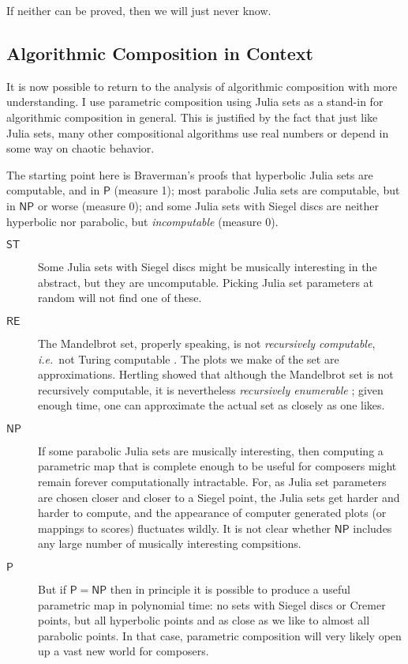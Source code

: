 \documentclass[11pt,papersize=a4]{scrartcl}
\begin{document}
If neither can be proved, then we will just never know.
 
\subsection*{Algorithmic Composition in Context}

It is now possible to return to the analysis of algorithmic composition with more understanding. I use parametric composition using Julia sets as a stand-in for algorithmic composition in general. This is justified by the fact that just like Julia sets, many other compositional algorithms use real numbers or depend in some way on chaotic behavior. 

The starting point here is Braverman's proofs \parencite{braverman2006non, braverman2008computability, braverman2009computability} that hyperbolic Julia sets are computable, and in $\mathsf{P}$ (measure 1); most parabolic Julia sets are computable, but in $\mathsf{NP}$ or worse (measure 0); and some Julia sets with Siegel discs are neither hyperbolic nor parabolic, but \emph{incomputable} (measure 0).
\begin{description}
\item[$\mathsf{ST}$]  Some Julia sets with Siegel discs might be musically interesting in the abstract, but they are uncomputable. Picking Julia set parameters at random will not find one of these.
\item[$\mathsf{RE}$] The Mandelbrot set, properly speaking, is not \emph{recursively computable}, \emph{i.e.}\ not Turing computable \parencite{blum1993godel}. The plots we make of the set are approximations. Hertling showed that although the  Mandelbrot set is not recursively computable, it is nevertheless \emph{recursively enumerable} \parencite{Hertling2005-HERITM-3}; given enough time, one can approximate the actual set as closely as one likes. 
\item[$\mathsf{NP}$] If some parabolic Julia sets are musically interesting, then computing a parametric map that is complete enough to be useful for composers might remain forever computationally intractable. For, as Julia set parameters are chosen closer and closer to a Siegel point, the Julia sets get harder and harder to compute, and the appearance of computer generated plots (or mappings to scores) fluctuates wildly. It is not clear whether $\mathsf{NP}$ includes any large number of musically interesting compsitions.
\item[$\mathsf{P}$] But if $\mathsf{P} = \mathsf{NP}$ then in principle it is possible to produce a useful parametric map in polynomial time: no sets with Siegel discs or Cremer points, but all hyperbolic points and as close as we like to almost all parabolic points. In that case, parametric composition will very likely open up a vast new world for composers.
\end{description}
\end{document}

